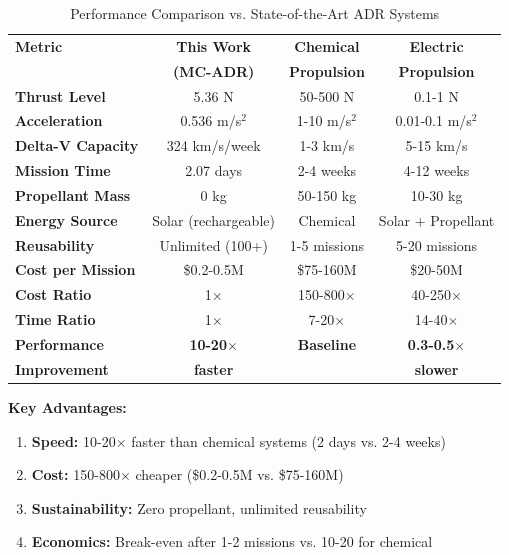 \documentclass[12pt,a4paper]{article}
\begin{document}
\begin{table}[H]
\centering
\caption{Performance Comparison vs. State-of-the-Art ADR Systems}
\label{tab:comparison}
\begin{tabular}{@{}lccc@{}}
\toprule
\textbf{Metric} & \textbf{This Work} & \textbf{Chemical} & \textbf{Electric} \\
                & \textbf{(MC-ADR)}  & \textbf{Propulsion} & \textbf{Propulsion} \\ \midrule
\textbf{Thrust Level} & 5.36 N & 50-500 N & 0.1-1 N \\
\textbf{Acceleration} & 0.536 m/s$^2$ & 1-10 m/s$^2$ & 0.01-0.1 m/s$^2$ \\
\textbf{Delta-V Capacity} & 324 km/s/week & 1-3 km/s & 5-15 km/s \\
\textbf{Mission Time} & 2.07 days & 2-4 weeks & 4-12 weeks \\
\textbf{Propellant Mass} & 0 kg & 50-150 kg & 10-30 kg \\
\textbf{Energy Source} & Solar (rechargeable) & Chemical & Solar + Propellant \\
\textbf{Reusability} & Unlimited (100+) & 1-5 missions & 5-20 missions \\
\textbf{Cost per Mission} & \$0.2-0.5M & \$75-160M & \$20-50M \\
\textbf{Cost Ratio} & 1$\times$ & 150-800$\times$ & 40-250$\times$ \\
\textbf{Time Ratio} & 1$\times$ & 7-20$\times$ & 14-40$\times$ \\ \midrule
\textbf{Performance} & \textbf{10-20$\times$} & \textbf{Baseline} & \textbf{0.3-0.5$\times$} \\
\textbf{Improvement} & \textbf{faster} & & \textbf{slower} \\ \bottomrule
\end{tabular}
\end{table}

\textbf{Key Advantages:}
\begin{enumerate}
\item \textbf{Speed:} 10-20$\times$ faster than chemical systems (2 days vs. 2-4 weeks)
\item \textbf{Cost:} 150-800$\times$ cheaper (\$0.2-0.5M vs. \$75-160M)
\item \textbf{Sustainability:} Zero propellant, unlimited reusability
\item \textbf{Economics:} Break-even after 1-2 missions vs. 10-20 for chemical
\end{enumerate}
\end{document}
